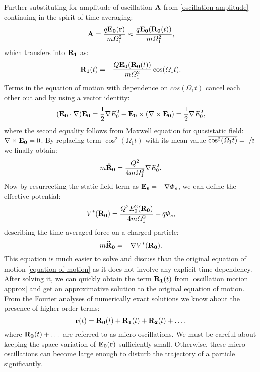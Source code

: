 Further substituting for amplitude of oscillation $\vb{A}$ from \eqref{oscillation amplitude} continuing in the spirit of time-averaging:
\begin{equation}
	\vb{A} = \frac{q \vb{E_0}(\vb{r})}{m \Omega_1^2} \approx \frac{q \vb{E_0}(\vb{R_0}(t))}{m \Omega_1^2},
\end{equation}
which transfers into $\vb{R_1}$ as:
\begin{equation}
	\label{oscillation motion approx}
	\vb{R_1}(t) = - \frac{Q \vb{E_0}(\vb{R_0}(t))}{m \Omega_1^2} \cos(\Omega_1 t). 
\end{equation}
Terms in the equation of motion with dependence on $cos(\Omega_1 t)$ cancel each other out and by using a vector identity:
\begin{equation}
	(\vb{E_0} \cdot \nabla) \vb{E_0} = \frac{1}{2} \nabla E_0^2 - \vb{E_0} \times (\nabla \times \vb{E_0}) = \frac{1}{2} \nabla E_0^2,
\end{equation}
where the second equality follows from Maxwell equation for quasistatic field: \\ $\nabla \times \vb{E_0} = 0$. By replacing term $\cos^2(\Omega_1 t)$ with its mean value $\overline{\cos^2(\Omega_1 t)} = \nicefrac{1}{2}$ we finally obtain:
\begin{equation}
	m \vb{\ddot{R}_0} = \frac{Q^2}{4 m \Omega_1^2} \nabla E_0^2.
\end{equation}
Now by resurrecting the static field term as $\vb{E_s} = - \nabla \Phi_s$, we can define the effective potential:
\begin{equation}
	\label{effective potential}
	V^*(\vb{R_0}) = \frac{Q^2 E_0^2(\vb{R_0})}{4 m \Omega_1^2} + q \Phi_s, 
\end{equation}
describing the time-averaged force on a charged particle:
\begin{equation}
	\label{effective equation of motion}
	m \vb{\ddot{R}_0} = - \nabla V^*(\vb{R_0}). 
\end{equation}
This equation is much easier to solve and discuss than the original equation of motion \eqref{equation of motion} as it does not involve any explicit time-dependency. After solving it, we can quickly obtain the term $\vb{R_1}(t)$ from \eqref{oscillation motion approx} and get an approximative solution to the original equation of motion. From the Fourier analyses of numerically exact solutions \cite{gerlich1992inhomogeneous} we know about the presence of higher-order terms: $$\vb{r}(t) = \vb{R_0}(t) + \vb{R_1}(t) + \vb{R_2}(t) + \dots,$$ where $\vb{R_2}(t) + \dots$ are referred to as micro oscillations. We must be careful about keeping the space variation of $\vb{E_0}(\vb{r})$ sufficiently small. Otherwise, these micro oscillations can become large enough to disturb the trajectory of a particle significantly.


